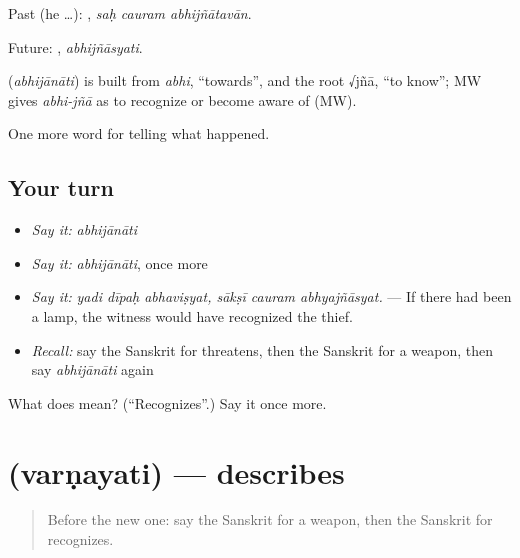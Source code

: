 Past (he …):   , \emph{saḥ cauram abhijñātavān}.

Future: , \emph{abhijñāsyati}.

\begin{cousinweb}
\textbf{} (\emph{abhijānāti}) is built from \emph{abhi}, \textquotedblleft{}towards\textquotedblright{}, and the root √jñā, \textquotedblleft{}to know\textquotedblright{}; MW gives \emph{abhi-jñā} as to recognize or become aware of (MW).
\end{cousinweb}

\begin{grammarlens}[title={What you've built}]
One more word for telling what happened.
\end{grammarlens}

\subsection*{Your turn}
\begin{itemize}
\raggedright
  \item \emph{Say it:} \emph{abhijānāti}
  \item \emph{Say it:} \emph{abhijānāti}, once more
  \item \emph{Say it:} \emph{yadi dīpaḥ abhaviṣyat, sākṣī cauram abhyajñāsyat.} — If there had been a lamp, the witness would have recognized the thief.
  \item \emph{Recall:} say the Sanskrit for threatens, then the Sanskrit for a weapon, then say \emph{abhijānāti} again
\end{itemize}

\begin{tcolorbox}[breakable,colback=teal!4,colframe=teal!35!black,title={Before you move on}]
What does  mean? (\textquotedblleft{}Recognizes\textquotedblright{}.) Say it once more.
\end{tcolorbox}
\section[\texorpdfstring{\sk{वर्णयति} (varṇayati)}{वर्णयति (varṇayati)}]{ (varṇayati) — describes}

\label{lesson:SA-C289-varnayati}



\begin{quote}
Before the new one: say the Sanskrit for a weapon, then the Sanskrit for recognizes.
\end{quote}

